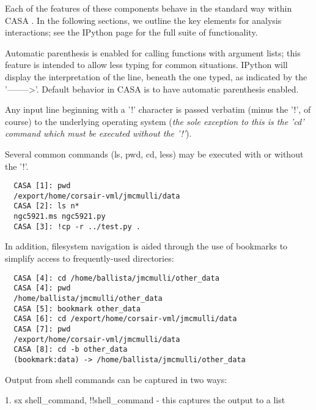 Each of the features of these components behave in the standard way
within CASA . In the following sections, we outline the key elements
for analysis interactions; see the IPython page for the full suite of
functionality.

\vspace{3mm}

Automatic parenthesis is enabled for calling functions with argument
lists; this feature is intended to allow less typing for common
situations. IPython will display the interpretation of the line,
beneath the one typed, as indicated by the '-------->'. Default
behavior in CASA is to have automatic parenthesis enabled. 

\vspace{3mm}

Any input line beginning with a '!' character is passed verbatim
(minus the '!', of course) to the underlying operating system ({\it the
sole exception to this is the 'cd' command which must be executed
without the '!'}). 

Several common commands (ls, pwd, cd, less) may be executed with or
without the '!'. 

\small
\begin{verbatim}
  CASA [1]: pwd
  /export/home/corsair-vml/jmcmulli/data
  CASA [2]: ls n*
  ngc5921.ms ngc5921.py
  CASA [3]: !cp -r ../test.py .
\end{verbatim}
\normalsize

In addition, filesystem navigation is aided through the use of
bookmarks to simplify access to frequently-used directories: 

\small
\begin{verbatim}
  CASA [4]: cd /home/ballista/jmcmulli/other_data
  CASA [4]: pwd
  /home/ballista/jmcmulli/other_data
  CASA [5]: bookmark other_data
  CASA [6]: cd /export/home/corsair-vml/jmcmulli/data
  CASA [7]: pwd
  /export/home/corsair-vml/jmcmulli/data
  CASA [8]: cd -b other_data
  (bookmark:data) -> /home/ballista/jmcmulli/other_data
\end{verbatim}
\normalsize

Output from shell commands can be captured in two ways:

1. sx shell\_command, !!shell\_command - this captures the output to a list 

